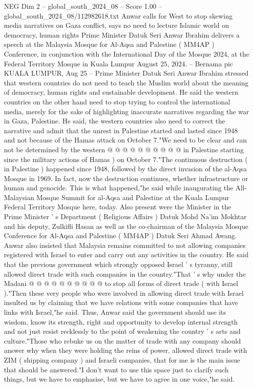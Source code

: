 \begin{textsample}{NEG Dim 2 – global\_south\_2024\_08 – Score 1.00 – global\_south\_2024\_08/112982618.txt}  \label{ex:f2_neg_113}
Anwar calls for West to stop skewing media narratives on Gaza conflict, says no need to lecture Islamic world on democracy, human rights Prime Minister Datuk Seri Anwar Ibrahim delivers a speech at the Malaysia Mosque for Al-Aqsa and Palestine ( MM4AP ) Conference, in conjunction with the International Day of the Mosque 2024, at the Federal Territory Mosque in Kuala Lumpur August 25, 2024. -- Bernama pic KUALA LUMPUR, Aug 25 -- Prime Minister Datuk Seri Anwar Ibrahim stressed that western countries do not need to teach the Muslim world about the meaning of democracy, human rights and sustainable development.
He said the western countries on the other hand need to stop trying to control the international media, merely for the sake of highlighting inaccurate narratives regarding the war in Gaza, Palestine.
He said, the western countries also need to correct the narrative and admit that the unrest in Palestine started and lasted since 1948 and not because of the Hamas attack on October 7."We need to be clear and can not be determined by the western @ @ @ @ @ @ @ @ @ @ in Palestine starting since the military actions of Hamas ) on October 7."The continuous destruction ( in Palestine ) happened since 1948, followed by the direct invasion of the al-Aqsa Mosque in 1969.
In fact, now the destruction continues, whether infrastructure or human and genocide.
This is what happened,"he said while inaugurating the All-Malaysian Mosque Summit for al-Aqsa and Palestine at the Kuala Lumpur Federal Territory Mosque here, today.
Also present were the Minister in the Prime Minister ' s Department ( Religious Affairs ) Datuk Mohd Na'im Mokhtar and his deputy, Zulkifli Hasan as well as the co-chairman of the Malaysia Mosque Conference for Al-Aqsa and Palestine ( MM4AP ) Datuk Seri Ahmad Awang.
Anwar also insisted that Malaysia remains committed to not allowing companies registered with Israel to enter and carry out any activities in the country.
He said that the previous government which strongly opposed Israel ' s tyranny, still allowed direct trade with such companies in the country."That ' s why under the Madani @ @ @ @ @ @ @ @ @ @ to stop all forms of direct trade ( with Israel )."Then these very people who were involved in allowing direct trade with Israel insulted us by claiming that we have relations with some companies that have links with Israel,"he said.
Thus, Anwar said the government should use its wisdom, know its strength, right and opportunity to develop internal strength and not just resist recklessly to the point of weakening the country ' s arts and culture."Those who rebuke us on the matter of trade with any company should answer why when they were holding the reins of power, allowed direct trade with ZIM ( shipping company ) and Israeli companies, that for me is the main issue that should be answered."I don't want to use this space just to clarify such things, but we have to emphasise, but we have to agree in one voice,"he said.

\end{textsample}
